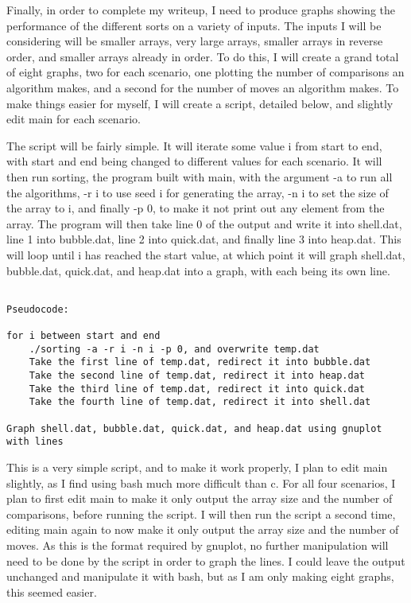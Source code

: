 \documentclass[11pt]{article}
\begin{document}
Finally, in order to complete my writeup, I need to produce graphs showing the performance of the different sorts on a variety of inputs. The inputs I will be considering will be smaller arrays, very large arrays, smaller arrays in reverse order, and smaller arrays already in order. To do this, I will create a grand total of eight graphs, two for each scenario, one plotting the number of comparisons an algorithm makes, and a second for the number of moves an algorithm makes. To make things easier for myself, I will create a script, detailed below, and slightly edit main for each scenario.

The script will be fairly simple. It will iterate some value i from start to end, with start and end being changed to different values for each scenario. It will then run sorting, the program built with main, with the argument -a to run all the algorithms, -r i to use seed i for generating the array, -n i to set the size of the array to i, and finally -p 0, to make it not print out any element from the array. The program will then take line 0 of the output and write it into shell.dat, line 1 into bubble.dat, line 2 into quick.dat, and finally line 3 into heap.dat. This will loop until i has reached the start value, at which point it will graph shell.dat, bubble.dat, quick.dat, and heap.dat into a graph, with each being its own line.

\begin{verbatim}

Pseudocode:

for i between start and end
    ./sorting -a -r i -n i -p 0, and overwrite temp.dat
    Take the first line of temp.dat, redirect it into bubble.dat
    Take the second line of temp.dat, redirect it into heap.dat
    Take the third line of temp.dat, redirect it into quick.dat
    Take the fourth line of temp.dat, redirect it into shell.dat

Graph shell.dat, bubble.dat, quick.dat, and heap.dat using gnuplot with lines

\end{verbatim}

This is a very simple script, and to make it work properly, I plan to edit main slightly, as I find using bash much more difficult than c. For all four scenarios, I plan to first edit main to make it only output the array size and the number of comparisons, before running the script. I will then run the script a second time, editing main again to now make it only output the array size and the number of moves. As this is the format required by gnuplot, no further manipulation will need to be done by the script in order to graph the lines. I could leave the output unchanged and manipulate it with bash, but as I am only making eight graphs, this seemed easier.
\end{document}

